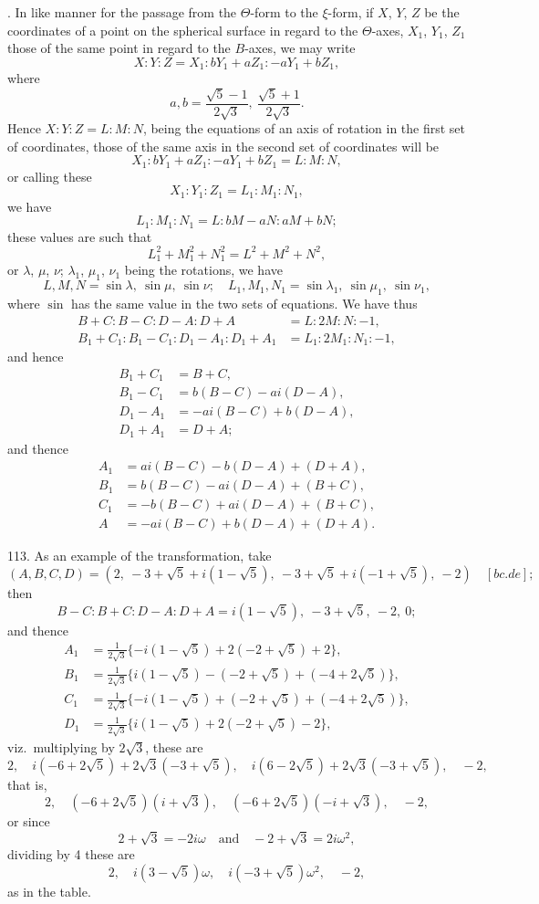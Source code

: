 \documentclass[12pt,a4paper]{article}
\begin{document}
. In like manner for the passage from the $\Theta$-form to the $\xi$-form, if $X$, $Y$, $Z$ be the coordinates of a point on the spherical surface in regard to the $\Theta$-axes, $X_1$, $Y_1$, $Z_1$ those of the same point in regard to the $B$-axes, we may write
\[
X : Y : Z = X_1 : bY_1 + aZ_1 : -aY_1 + bZ_1,
\]
where
\[
a, b = \frac{\sqrt{5}-1}{2\sqrt{3}},\ \frac{\sqrt{5}+1}{2\sqrt{3}}.
\]
Hence $X : Y : Z = L : M : N$, being the equations of an axis of rotation in the first set of coordinates, those of the same axis in the second set of coordinates will be
\[
X_1 : bY_1 + aZ_1 : -aY_1 + bZ_1 = L : M : N,
\]
or calling these
\[
X_1 : Y_1 : Z_1 = L_1 : M_1 : N_1,
\]
we have
\[
L_1 : M_1 : N_1 = L : bM - aN : aM + bN;
\]
these values are such that
\[
L_1^2 + M_1^2 + N_1^2 = L^2 + M^2 + N^2,
\]
or $\lambda$, $\mu$, $\nu$; $\lambda_1$, $\mu_1$, $\nu_1$ being the rotations, we have
\[
L, M, N = \sin\lambda,\ \sin\mu,\ \sin\nu;\quad L_1, M_1, N_1 = \sin\lambda_1,\ \sin\mu_1,\ \sin\nu_1,
\]
where $\sin$ has the same value in the two sets of equations. We have thus
\begin{align*}
B+C : B-C : D-A : D+A &= L : 2M : N : -1, \\
B_1+C_1 : B_1-C_1 : D_1-A_1 : D_1+A_1 &= L_1 : 2M_1 : N_1 : -1,
\end{align*}
and hence
\begin{align*}
B_1 + C_1 &= B + C, \\
B_1 - C_1 &= b(B-C) - ai(D-A), \\
D_1 - A_1 &= -ai(B-C) + b(D-A), \\
D_1 + A_1 &= D + A;
\end{align*}
and thence
\begin{align*}
A_1 &= ai(B-C) - b(D-A) + (D+A), \\
B_1 &= b(B-C) - ai(D-A) + (B+C), \\
C_1 &= -b(B-C) + ai(D-A) + (B+C), \\
A &= -ai(B-C) + b(D-A) + (D+A).
\end{align*}

113. As an example of the transformation, take
\[
(A, B, C, D) = (2,\ -3+\sqrt{5}+i(1-\sqrt{5}),\ -3+\sqrt{5}+i(-1+\sqrt{5}),\ -2)\quad [bc.de];
\]
then
\[
B-C : B+C : D-A : D+A = i(1-\sqrt{5}),\ -3+\sqrt{5},\ -2,\ 0;
\]
\newpage
\noindent and thence
\begin{align*}
A_1 &= \frac{1}{2\sqrt{3}}\{-i(1-\sqrt{5}) + 2(-2+\sqrt{5}) + 2\}, \\
B_1 &= \frac{1}{2\sqrt{3}}\{i(1-\sqrt{5}) - (-2+\sqrt{5}) + (-4+2\sqrt{5})\}, \\
C_1 &= \frac{1}{2\sqrt{3}}\{-i(1-\sqrt{5}) + (-2+\sqrt{5}) + (-4+2\sqrt{5})\}, \\
D_1 &= \frac{1}{2\sqrt{3}}\{i(1-\sqrt{5}) + 2(-2+\sqrt{5}) - 2\},
\end{align*}
viz.~multiplying by $2\sqrt{3}$, these are
\[
2,\quad i(-6+2\sqrt{5}) + 2\sqrt{3}(-3+\sqrt{5}),\quad i(6-2\sqrt{5}) + 2\sqrt{3}(-3+\sqrt{5}),\quad -2,
\]
that is,
\[
2,\quad (-6+2\sqrt{5})(i+\sqrt{3}),\quad (-6+2\sqrt{5})(-i+\sqrt{3}),\quad -2,
\]
or since
\[
2 + \sqrt{3} = -2i\omega \quad \text{and} \quad -2 + \sqrt{3} = 2i\omega^2,
\]
dividing by 4 these are
\[
2,\quad i(3-\sqrt{5})\omega,\quad i(-3+\sqrt{5})\omega^2,\quad -2,
\]
as in the table.
\end{document}
